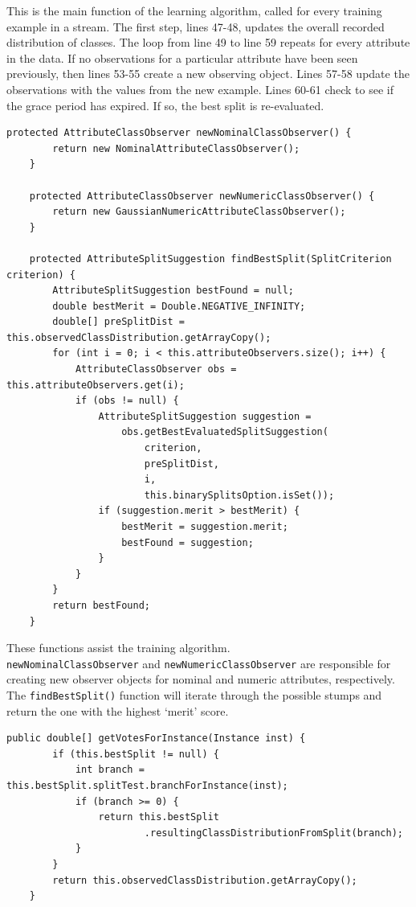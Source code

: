 \documentclass[a4paper,12pt]{article}
\begin{document}
This is the main function of the learning algorithm, called for every training example in a stream. The first step, lines 47-48, updates the overall recorded distribution of classes. The loop from line 49 to line 59 repeats for every attribute in the data. If no observations for a particular attribute have been seen previously, then lines 53-55 create a new observing object. Lines 57-58 update the observations with the values from the new example. Lines 60-61 check to see if the grace period has expired. If so, the best split is re-evaluated.

\begin{lstlisting}[caption={Functions used during training},label=lst:trainfuncs,firstnumber=79]
	protected AttributeClassObserver newNominalClassObserver() {
		return new NominalAttributeClassObserver();
	}

	protected AttributeClassObserver newNumericClassObserver() {
		return new GaussianNumericAttributeClassObserver();
	}

	protected AttributeSplitSuggestion findBestSplit(SplitCriterion criterion) {
		AttributeSplitSuggestion bestFound = null;
		double bestMerit = Double.NEGATIVE_INFINITY;
		double[] preSplitDist = this.observedClassDistribution.getArrayCopy();
		for (int i = 0; i < this.attributeObservers.size(); i++) {
			AttributeClassObserver obs = this.attributeObservers.get(i);
			if (obs != null) {
				AttributeSplitSuggestion suggestion =
					obs.getBestEvaluatedSplitSuggestion(
						criterion,
						preSplitDist,
						i,
						this.binarySplitsOption.isSet());
				if (suggestion.merit > bestMerit) {
					bestMerit = suggestion.merit;
					bestFound = suggestion;
				}
			}
		}
		return bestFound;
	}
\end{lstlisting}

These functions assist the training algorithm. \\ \verb+newNominalClassObserver+ and \verb+newNumericClassObserver+ are responsible for creating new observer objects for nominal and numeric attributes, respectively. The \verb+findBestSplit()+ function will iterate through the possible stumps and return the one with the highest `merit' score.

\begin{lstlisting}[caption={Predicting class of unknown examples},label=lst:test,firstnumber=68]
	public double[] getVotesForInstance(Instance inst) {
		if (this.bestSplit != null) {
			int branch = this.bestSplit.splitTest.branchForInstance(inst);
			if (branch >= 0) {
				return this.bestSplit
						.resultingClassDistributionFromSplit(branch);
			}
		}
		return this.observedClassDistribution.getArrayCopy();
	}
\end{lstlisting}
\end{document}
